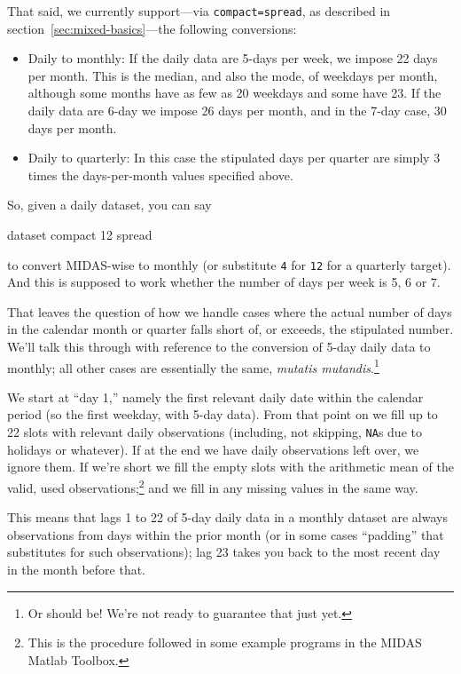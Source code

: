 That said, we currently support---via \texttt{compact=spread}, as
described in section~\ref{sec:mixed-basics}---the following
conversions:
\begin{itemize}
\item Daily to monthly: If the daily data are 5-days per week, we
  impose 22 days per month. This is the median, and also the mode, of
  weekdays per month, although some months have as few as 20 weekdays
  and some have 23. If the daily data are 6-day we impose
  26 days per month, and in the 7-day case, 30 days per month.

\item Daily to quarterly: In this case the stipulated days per quarter
  are simply 3 times the days-per-month values specified above.
\end{itemize}

So, given a daily dataset, you can say
%
\begin{code}
dataset compact 12 spread
\end{code}
%
to convert MIDAS-wise to monthly (or substitute \texttt{4} for
\texttt{12} for a quarterly target). And this is supposed to work
whether the number of days per week is 5, 6 or 7.

That leaves the question of how we handle cases where the actual
number of days in the calendar month or quarter falls short of, or
exceeds, the stipulated number. We'll talk this through with reference
to the conversion of 5-day daily data to monthly; all other cases are
essentially the same, \textit{mutatis mutandis}.\footnote{Or should
  be! We're not ready to guarantee that just yet.}

We start at ``day 1,'' namely the first relevant daily date within the
calendar period (so the first weekday, with 5-day data). From that
point on we fill up to 22 slots with relevant daily observations
(including, not skipping, \texttt{NA}s due to holidays or whatever).
If at the end we have daily observations left over, we ignore them. If
we're short we fill the empty slots with the arithmetic mean of the
valid, used observations;\footnote{This is the procedure followed in
  some example programs in the \textsf{MIDAS Matlab Toolbox}.} and we
fill in any missing values in the same way.

This means that lags 1 to 22 of 5-day daily data in a monthly dataset
are always observations from days within the prior month (or in some
cases ``padding'' that substitutes for such observations); lag 23
takes you back to the most recent day in the month before that.

